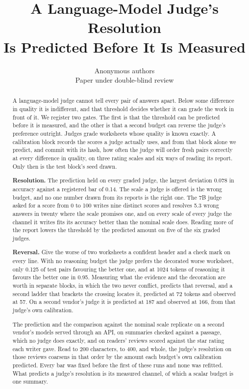 \documentclass{article}
\title{A Language-Model Judge's Resolution\\Is Predicted Before It Is Measured}
\author{Anonymous authors\\Paper under double-blind review}
\theoremstyle{definition}
\theoremstyle{remark}
\begin{document}
\maketitle

\begin{abstract}
A language-model judge cannot tell every pair of answers apart. Below some difference in quality it is indifferent, and that threshold decides whether it can grade the work in front of it. We register two gates. The first is that the threshold can be predicted before it is measured, and the other is that a second budget can reverse the judge's preference outright. Judges grade worksheets whose quality is known exactly. A calibration block records the scores a judge actually uses, and from that block alone we predict, and commit with its hash, how often the judge will order fresh pairs correctly at every difference in quality, on three rating scales and six ways of reading its report. Only then is the test block's seed drawn.

\textbf{Resolution.} The prediction held on every graded judge, the largest deviation 0.078 in accuracy against a registered bar of 0.14. The scale a judge is offered is the wrong budget, and no one number drawn from its reports is the right one. The 7B judge asked for a score from 0 to 100 writes nine distinct scores and resolves 5.3 wrong answers in twenty where the scale promises one, and on every scale of every judge the channel it writes fits its accuracy better than the nominal scale does. Reading more of the report lowers the threshold by the predicted amount on five of the six graded judges.

\textbf{Reversal.} Give the worse of two worksheets a confident header and a check mark on every line. With no reasoning budget the judge prefers the decorated worse worksheet, only 0.125 of test pairs favouring the better one, and at 1024 tokens of reasoning it favours the better one in 0.95. Measuring what the evidence and the decoration are worth in separate blocks, in which the two never conflict, predicts that reversal, and a second ladder that brackets the crossing locates it, predicted at 72 tokens and observed at 57. On a second vendor's judge it is predicted at 187 and observed at 166, from that judge's own calibration.

The prediction and the comparison against the nominal scale replicate on a second vendor's models served through an API, on summaries checked against a passage, which no judge does exactly, and on readers' reviews scored against the star rating each writer gave. Read to 200 characters, to 400, and whole, the judge's resolution on those reviews coarsens in that order by the amount each budget's own calibration predicted. Every bar was fixed before the first of these runs and none was refitted. What predicts a judge's resolution is its measured channel, of which a scalar budget is one summary.
\end{abstract}
\end{document}
